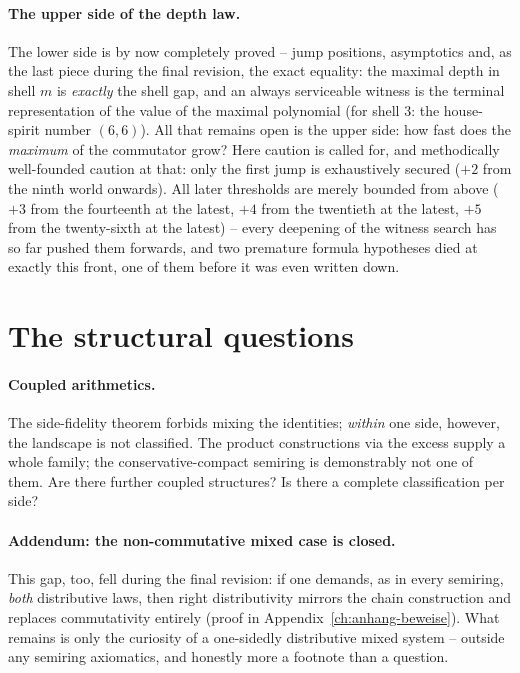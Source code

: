 \paragraph{The upper side of the depth law.} The lower side is by
now completely proved -- jump positions, asymptotics and, as the
last piece during the final revision, the exact equality: the
maximal depth in shell $m$ is \emph{exactly} the shell gap, and an
always serviceable witness is the terminal representation of the
value of the maximal polynomial (for shell 3: the house-spirit
number $(6,6)$).
All that remains open is the upper side: how fast does the
\emph{maximum} of the commutator grow? Here caution is called for,
and methodically well-founded caution at that: only the first jump
is exhaustively secured ($+2$ from the ninth world onwards). All
later thresholds are merely bounded from above ($+3$ from the
fourteenth at the latest, $+4$ from the twentieth at the latest,
$+5$ from the twenty-sixth at the latest) -- every deepening of
the witness search has so far pushed them forwards, and two
premature formula hypotheses died at exactly this front, one of
them before it was even written down.

\section{The structural questions}

\paragraph{Coupled arithmetics.} The side-fidelity theorem forbids
mixing the identities; \emph{within} one side, however, the
landscape is not classified. The product constructions via the
excess supply a whole family; the conservative-compact semiring is
demonstrably not one of them. Are there further coupled
structures? Is there a complete classification per side?

\paragraph{Addendum: the non-commutative mixed case is closed.}
This gap, too, fell during the final revision: if one demands, as
in every semiring, \emph{both} distributive laws, then right
distributivity mirrors the chain construction and replaces
commutativity entirely (proof in
Appendix~\ref{ch:anhang-beweise}). What remains is only the
curiosity of a one-sidedly distributive mixed system -- outside
any semiring axiomatics, and honestly more a footnote than a
question.

